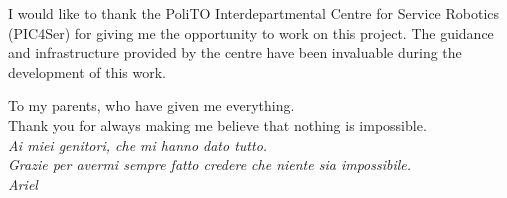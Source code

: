 
\ifprint \vspace*{10\baselineskip} \else
{I would like to thank the PoliTO Interdepartmental Centre for Service Robotics (PIC4Ser) for giving me the opportunity to work on this project. The guidance and infrastructure provided by the centre have been invaluable during the development of this work.
\vspace*{5\baselineskip}}
\fi

\begin{flushright}
    To my parents, who have given me everything.\\
    Thank you for always making me believe that nothing is impossible.\\
    \textit{{Ai miei genitori, che mi hanno dato tutto.\\ 
    Grazie per avermi sempre fatto credere che niente sia impossibile.}} \\[\baselineskip]
    \textit{Ariel}
\end{flushright}
